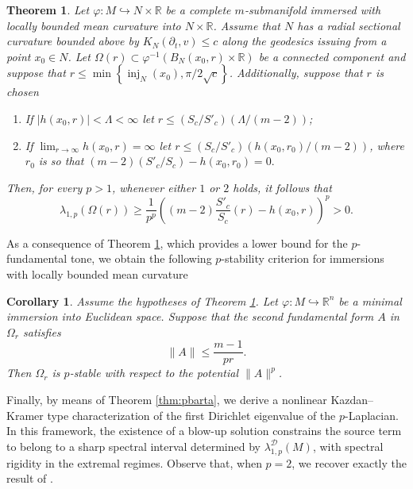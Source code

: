 \documentclass{article}
\newtheorem{theorem}{Theorem}[section]
\newtheorem{cor}[thm]{Corollary}
\begin{document}
\begin{theorem}\label{thmlowerptone}
Let $\varphi\colon M \hookrightarrow N \times \mathbb{R}$ be a complete  $m$-submanifold immersed with locally bounded mean curvature into $ N \times \mathbb{R}$. Assume that $N$ has a radial sectional curvature bounded above by $K_N(\partial_t,v) \leq c$ along the geodesics issuing from a point $x_0\in N$. Let $\Omega(r)\subset \varphi^{-1}\left(B_N(x_0,r)\times\mathbb{R}\right)$ be a connected component and suppose that $r \leq \min \left\{\operatorname{inj}_N(x_0), \pi/2\sqrt{c} \right\}$. Additionally, suppose that $r$ is chosen
\begin{enumerate}
\item If $|h(x_0,r)|< \Lambda < \infty$ let $r \leq (S_c / S'_c)(\Lambda/(m-2))$;
\item If $\displaystyle \lim_{r \to \infty}h(x_0,r) = \infty$ let $r \leq (S_c / S'_c)(h(x_0,r_{0})/(m-2))$, where $r_0$ is so that $(m-2)(S'_c/S_c)-h(x_0,r_0)=0.$
\end{enumerate}
Then, for every $p>1$, whenever either $1$ or $2$ holds, it follows that
\begin{equation}
 \lambda_{1,p}(\Omega(r)) \geq    \frac{1}{p^{p}}
\left((m-2)\frac{S'_c}{S_c}(r)-h(x_0,r)\right)^{p} > 0.
\end{equation}
\end{theorem} 

As a consequence of Theorem \ref{thmlowerptone}, which provides a lower bound for the $p$-fundamental tone, we obtain the following $p$-stability criterion for immersions with locally bounded mean curvature
\begin{cor}\label{corpstaby}
Assume the hypotheses of Theorem \ref{thmlowerptone}. Let $\varphi \colon M \hookrightarrow \mathbb{R}^{n}$ be a minimal immersion into Euclidean space. Suppose that the second fundamental form $A$ in $\Omega_r$ satisfies
\begin{equation*}
    \|A\| \leq \frac{m-1}{pr}.
\end{equation*}
Then $\Omega_r$ is $p$-stable with respect to the potential $\|A\|^{p}$.
\end{cor} 

Finally, by means of Theorem \ref{thm:pbarta}, we derive a nonlinear Kazdan--Kramer \cite{KazdanKramer} type characterization of the first Dirichlet eigenvalue of the $p$-Laplacian. In this framework, the existence of a blow-up solution constrains the source term to belong to a sharp spectral interval determined by $\lambda_{1,p}^{\mathcal D}(M)$, with spectral rigidity in the extremal regimes. Observe that, when $p=2$, we recover exactly the result of \cite[Theorem 1.13]{BessaMontenegro}.
\end{document}
